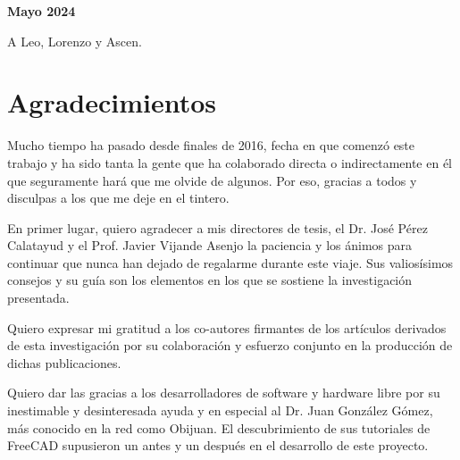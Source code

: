 \documentclass[
  a4paper,
]{scrreprt}
\begin{document}
\vfill %

{\bfseries\large Mayo 2024 \par}
\raggedright

\newpage
\thispagestyle{empty}
\begin{flushright}
\end{flushright}


\newpage
\thispagestyle{empty}
\begin{flushright}
A Leo, Lorenzo y Ascen.
\end{flushright}


\newpage
\thispagestyle{empty}
\begin{flushright}
\end{flushright}



\hypertarget{Agradecimientos}{%
\chapter*{Agradecimientos}\label{agradecimientos}}


Mucho tiempo ha pasado desde finales de 2016, fecha en que comenzó este trabajo y ha sido tanta la gente que ha colaborado directa o indirectamente en él que seguramente hará que me olvide de algunos. Por eso, gracias a todos y disculpas a los que me deje en el tintero.

En primer lugar, quiero agradecer a mis directores de tesis, el Dr. José Pérez Calatayud y el Prof. Javier Vijande Asenjo la paciencia y los ánimos para continuar que nunca han dejado de regalarme durante este viaje. Sus valiosísimos consejos y su guía son los elementos en los que se sostiene la investigación presentada.         

Quiero expresar mi gratitud a los co-autores firmantes de los artículos derivados de esta investigación por su colaboración y esfuerzo conjunto en la producción de dichas publicaciones.

Quiero dar las gracias a los desarrolladores de software y hardware libre por su inestimable y desinteresada ayuda y en especial al Dr. Juan González Gómez, más conocido en la red como Obijuan. El descubrimiento de sus tutoriales de FreeCAD supusieron un antes y un después en el desarrollo de este proyecto.   
\end{document}
